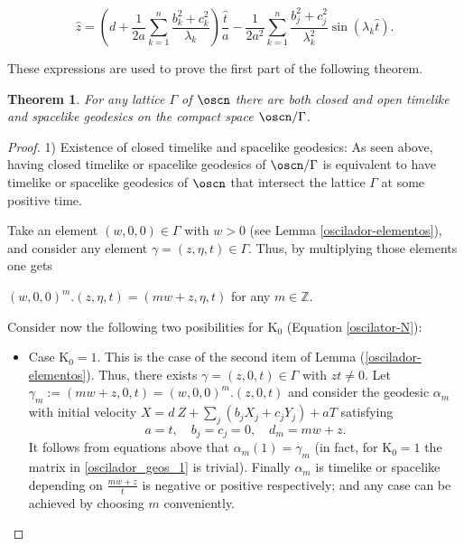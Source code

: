 \documentclass[12pt]{amsart}
\theoremstyle{plain}
\newtheorem{thm}{Theorem}[section]
\theoremstyle{definition}
\theoremstyle{remark}
\begin{document}
		\begin{equation}\label{oscilador_geos_2}
			\hat{z} =  \left(d + \frac{1}{2 a} \sum_{k=1}^{n} \frac{ b_{k}^{2}+c_k^{2}}{\lambda_k}\right)\frac{\hat{t}}{a}- \frac{1}{2 a^{2}}  \sum_{k=1}^{n} \frac{b_{j}^{2}+c_j^2}{\lambda_k^{2}} \sin(\lambda_k \hat{t}).
		\end{equation}
		
		These expressions are used to prove the first part of the following theorem.
		
			\begin{thm}\label{othergeodesics}
			For any lattice $\Gamma$ of $\oscn$ there are both closed and open timelike and spacelike geodesics on the compact space $\oscn / \Gamma$.
		\end{thm}
		
		\begin{proof}
						1) Existence of closed timelike and spacelike geodesics: As seen above,  having closed timelike or spacelike geodesics of $\oscn/\Gamma$ is equivalent to have timelike or spacelike geodesics of $\oscn$ that intersect the lattice $\Gamma$ at some positive time.
			
			Take an element $(w,0,0) \in \Gamma$ with $w>0$ (see Lemma \ref{oscilador-elementos}), and consider any element $\gamma=(z, \eta, t) \in \Gamma$. Thus,  by multiplying those elements one gets  
			
			$(w,0,0)^m.({z}, {\eta},{t})=(m w+{z},{\eta}, {t})$ for any $m \in \mathbb{Z}$. 
			
			Consider now the following two posibilities for $\mathrm{K_0}$ (Equation \eqref{oscilator-N}):
			
			\begin{itemize}
				\item Case $\mathrm{K_0} = 1$. This is the case of the second item of Lemma (\ref{oscilador-elementos}). Thus,  there exists $\gamma = (z,0,t) \in \Gamma$ with $z t \neq 0$. Let $\gamma_m := (m w+z, 0, t)=(w,0,0)^m.(z,0,t)$ and consider the geodesic $\alpha_m$ with initial velocity $X =  d \ Z + \sum_j (b_j X_j + c_j Y_j) + a T$ satisfying 
				$$a=t,\quad b_j=c_j=0, \quad d_m = m w + z.$$ 
				 It follows from equations above that $\alpha_m(1)=\gamma_m$ (in fact, for $\mathrm{K_0}=1$ the matrix in \eqref{oscilador_geos_1} is trivial). Finally $\alpha_m$ is timelike or spacelike depending on  $\frac{mw+z}{t}$ is negative or positive respectively; and  any case can be achieved by choosing $m$ conveniently. 
				

\end{itemize}
\end{proof}
\end{document}
